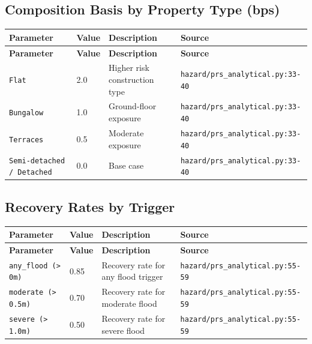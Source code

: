 \documentclass[11pt,a4paper]{article}
\begin{document}
\subsection{Composition Basis by Property Type (bps)}

\begin{longtable}{p{4cm}p{4cm}p{5.5cm}p{3.5cm}}
    \toprule
    \textbf{Parameter} & \textbf{Value} & \textbf{Description} & \textbf{Source} \\
    \midrule
    \endfirsthead
    \toprule
    \textbf{Parameter} & \textbf{Value} & \textbf{Description} & \textbf{Source} \\
    \midrule
    \endhead
    \bottomrule
    \endfoot
    \texttt{Flat} & 2.0 & Higher risk construction type & {\scriptsize \texttt{hazard/prs\_analytical.py:33-40}} \\
    \texttt{Bungalow} & 1.0 & Ground-floor exposure & {\scriptsize \texttt{hazard/prs\_analytical.py:33-40}} \\
    \texttt{Terraces} & 0.5 & Moderate exposure & {\scriptsize \texttt{hazard/prs\_analytical.py:33-40}} \\
    \texttt{Semi-detached / Detached} & 0.0 & Base case & {\scriptsize \texttt{hazard/prs\_analytical.py:33-40}} \\
\end{longtable}

\subsection{Recovery Rates by Trigger}

\begin{longtable}{p{4cm}p{4cm}p{5.5cm}p{3.5cm}}
    \toprule
    \textbf{Parameter} & \textbf{Value} & \textbf{Description} & \textbf{Source} \\
    \midrule
    \endfirsthead
    \toprule
    \textbf{Parameter} & \textbf{Value} & \textbf{Description} & \textbf{Source} \\
    \midrule
    \endhead
    \bottomrule
    \endfoot
    \texttt{any\_flood (> 0m)} & 0.85 & Recovery rate for any flood trigger & {\scriptsize \texttt{hazard/prs\_analytical.py:55-59}} \\
    \texttt{moderate (> 0.5m)} & 0.70 & Recovery rate for moderate flood & {\scriptsize \texttt{hazard/prs\_analytical.py:55-59}} \\
    \texttt{severe (> 1.0m)} & 0.50 & Recovery rate for severe flood & {\scriptsize \texttt{hazard/prs\_analytical.py:55-59}} \\
\end{longtable}
\end{document}
